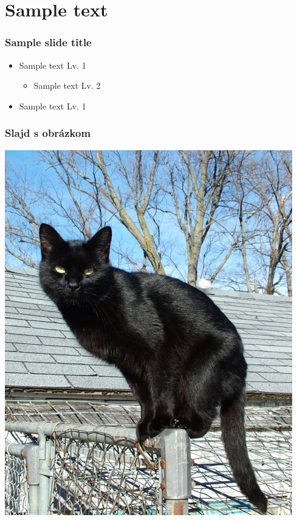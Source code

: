 \documentclass{beamer}
\begin{document}
\section{Sample text}

\begin{frame}[fragile=singleslide]\frametitle{Sample slide title}
	\begin{itemize}
		\item Sample text Lv. 1
		      \begin{itemize}
			      \item Sample text Lv. 2
		      \end{itemize}
		\item Sample text Lv. 1
	\end{itemize}
\end{frame}

\begin{frame}[fragile=singleslide]\frametitle{Slajd s obrázkom }
	\begin{center}
	\includegraphics[scale = 0.35]{gato.jpg}
	\end{center}
\end{frame}
\end{document}
